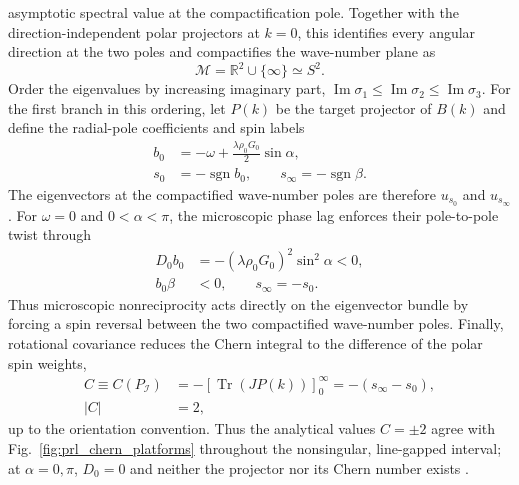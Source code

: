 \documentclass[aps,prl,reprint,superscriptaddress,nofootinbib,floatfix]{revtex4-2}
\begin{document}
asymptotic spectral value at the compactification pole. Together with the
direction-independent polar projectors at $k=0$, this identifies every angular
direction at the two poles and compactifies the wave-number plane as
\begin{equation}
  \mathcal M=\mathbb R^2\cup\{\infty\}\simeq S^2.
  \label{eq:prl_compactification}
\end{equation}
Order the eigenvalues by increasing imaginary part, $\operatorname{Im}\sigma_1\leq\operatorname{Im}\sigma_2\leq\operatorname{Im}\sigma_3$. For the first branch in this ordering, let $P(k)$ be the target projector of $B(k)$ and define the radial-pole coefficients and spin labels
\begin{equation}
  \begin{aligned}
  b_0&=-\omega+\frac{\lambda\rho_0G_0}{2}\sin\alpha,\\
  s_0&=-\operatorname{sgn}b_0,
  \qquad s_\infty=-\operatorname{sgn}\beta .
  \end{aligned}
  \label{eq:prl_pole_data}
\end{equation}
The eigenvectors at the compactified wave-number poles are therefore $u_{s_0}$ and $u_{s_\infty}$. For $\omega=0$ and $0<\alpha<\pi$, the microscopic phase lag enforces their pole-to-pole twist through
\begin{equation}
  \begin{aligned}
  D_0b_0&=-(\lambda\rho_0G_0)^2\sin^2\alpha<0,\\
  b_0\beta&<0,\qquad s_\infty=-s_0 .
  \end{aligned}
  \label{eq:prl_twist_condition}
\end{equation}
Thus microscopic nonreciprocity acts directly on the eigenvector bundle by forcing a spin reversal between the two compactified wave-number poles.
Finally, rotational covariance reduces the Chern integral to the difference of the polar spin weights,
\begin{equation}
  \begin{aligned}
  C\equiv C(P_{\mathcal I})&=-\left[\operatorname{Tr}(JP(k))\right]_{0}^{\infty}
  =-(s_\infty-s_0),\\
  |C|&=2,
  \end{aligned}
  \label{eq:prl_pole_chern}
\end{equation}
up to the orientation convention. Thus the analytical values $C=\pm2$ agree with Fig.~\ref{fig:prl_chern_platforms} throughout the nonsingular, line-gapped interval; at $\alpha=0,\pi$, $D_0=0$ and neither the projector nor its Chern number exists \cite{Zhu2026MethodsAppendix}.
\end{document}
